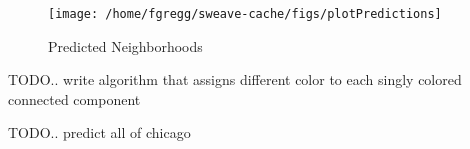 \documentclass[12pt,letter]{article}\usepackage[]{graphicx}\usepackage[]{color}
\makeatletter
\newenvironment{kframe}{%
 \def\at@end@of@kframe{}%
 \ifinner\ifhmode%
  \def\at@end@of@kframe{\end{minipage}}%
  \begin{minipage}{\columnwidth}%
 \fi\fi%
 \def\FrameCommand##1{\hskip\@totalleftmargin \hskip-\fboxsep
 \colorbox{shadecolor}{##1}\hskip-\fboxsep
     \hskip-\linewidth \hskip-\@totalleftmargin \hskip\columnwidth}%
 \MakeFramed {\advance\hsize-\width
   \@totalleftmargin\z@ \linewidth\hsize
   \@setminipage}}%
 {\par\unskip\endMakeFramed%
 \at@end@of@kframe}
\newenvironment{knitrout}{}{} %
\makeatother
\begin{document}
\begin{knitrout}
\color{fgcolor}\begin{kframe}


{\ttfamily\noindent\itshape\color{messagecolor}{\#\# Loading common}}\end{kframe}
\end{knitrout}

\begin{figure}
\begin{knitrout}
\color{fgcolor}

{\centering \texttt{[image: /home/fgregg/sweave-cache/figs/plotPredictions]} 

}



\end{knitrout}

\caption{Predicted Neighborhoods}
\end{figure}

TODO.. write algorithm that assigns different color to each singly
colored connected component

TODO.. predict all of chicago
\end{document}
